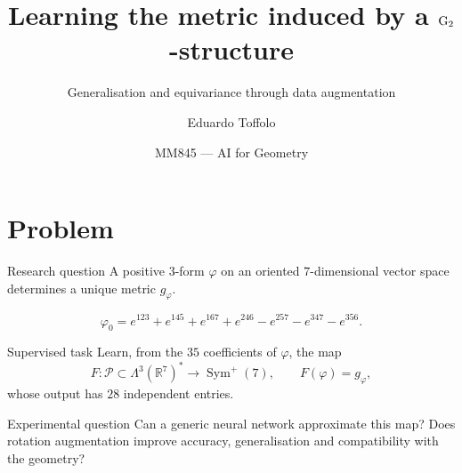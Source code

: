 \documentclass[aspectratio=169,11pt]{beamer}
\title[Learning the metric of a \texorpdfstring{$\Gtwo$}{G2}-structure]
{\texorpdfstring{Learning the metric induced by a $\Gtwo$-structure}
{Learning the metric induced by a G2-structure}}
\subtitle{Generalisation and equivariance through data augmentation}
\author[Eduardo Toffolo]{Eduardo Toffolo}
\institute[Unicamp]{University of Campinas}
\date{MM845 --- AI for Geometry}
\newcommand{\R}{\mathbb{R}}
\newcommand{\Sym}{\operatorname{Sym}}
\begin{document}
\begin{frame}
    \titlepage
\end{frame}

\section{Problem}

\begin{frame}{Research question}
    \small
    A positive $3$-form $\varphi$ on an oriented $7$-dimensional vector space
    determines a unique metric $g_\varphi$.

    \vspace{-0.10cm}
    \begin{equation*}
        \varphi_0=e^{123}+e^{145}+e^{167}+e^{246}
        -e^{257}-e^{347}-e^{356}.
    \end{equation*}

    \begin{block}{Supervised task}
        Learn, from the $35$ coefficients of $\varphi$, the map
        \begin{equation*}
            F:\mathcal P\subset\Lambda^3(\R^7)^*
            \longrightarrow \Sym^+(7),
            \qquad F(\varphi)=g_\varphi,
        \end{equation*}
        whose output has $28$ independent entries.
    \end{block}

    \begin{alertblock}{Experimental question}
        Can a generic neural network approximate this map? Does rotation augmentation
        improve accuracy, generalisation and compatibility with the geometry?
    \end{alertblock}
\end{frame}
\end{document}
